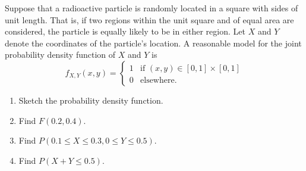 \begin{example}\label{Ex:JointDensityRadioactiveParticle}
Suppose that a radioactive particle is randomly located in a square with sides of unit length. That is, if two regions within the unit square and of equal area are considered, the particle is equally likely to be in either region. Let $X$ and $Y$ denote the coordinates of the particle's location. A reasonable model for the joint probability density function of $X$ and $Y$ is
    \[
        f_{X, Y} (x, y) = \left\lbrace \begin{matrix} 1 & \text{if } (x, y) \in [0, 1] \times [0, 1] \\
        0 & \text{elsewhere.} \end{matrix} \right.
    \]
\begin{enumerate}[label=\alph*)]
    \item Sketch the probability density function.
    \item Find $F(0.2, 0.4)$.
    \item\label{Ex:PartcOfRadioActiveParticle} Find $P (0.1 \leq X \leq 0.3 , 0 \leq Y \leq 0.5)$.
    \item Find $P (X + Y \leq 0.5 )$.
\end{enumerate}
\end{example}

